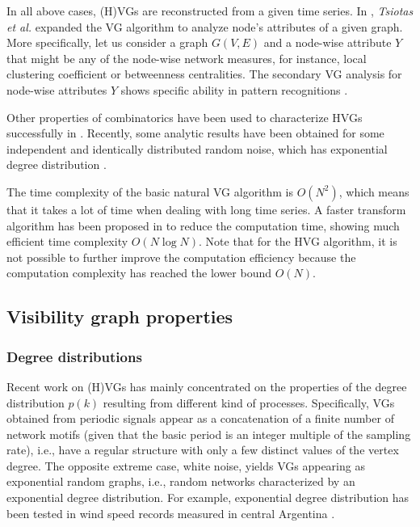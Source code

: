 		In all above cases, (H)VGs are reconstructed from a given time series. In \cite{Tsiotas2018}, {\textit {Tsiotas et al.}} expanded the VG algorithm to analyze node's attributes of a given graph. More specifically, let us consider a graph $G(V, E)$ and a node-wise attribute $Y$ that might be any of the node-wise network measures, for instance, local clustering coefficient or betweenness centralities. The secondary VG analysis for node-wise attributes $Y$ shows specific ability in pattern recognitions \cite{Tsiotas2018}. 
				
		Other properties of combinatorics have been used to characterize HVGs successfully in \cite{Gutin2011}. Recently, some analytic results have been obtained for some independent and identically distributed random noise, which has exponential degree distribution \cite{Wang2018}. 

		The time complexity of the basic natural VG algorithm is $O(N^2)$, which means that it takes a lot of time when dealing with long time series. A faster transform algorithm has been proposed in \cite{Lan2015a} to reduce the computation time, showing much efficient time complexity $O(N \log N)$. Note that for the HVG algorithm, it is not possible to further improve the computation efficiency because the computation complexity has reached the lower bound $O(N)$. 

	\subsection{Visibility graph properties}
		\subsubsection{Degree distributions}
		Recent work on (H)VGs has mainly concentrated on the properties of the degree distribution $p(k)$ resulting from different kind of processes. Specifically, VGs obtained from periodic signals appear as a concatenation of a finite number of network motifs (given that the basic period is an integer multiple of the sampling rate), i.e., have a regular structure with only a few distinct values of the vertex degree. The opposite extreme case, white noise, yields VGs appearing as exponential random graphs, i.e., random networks characterized by an exponential degree distribution. For example, exponential degree distribution has been tested in wind speed records measured in central Argentina \cite{Pierini2012}. 
		
